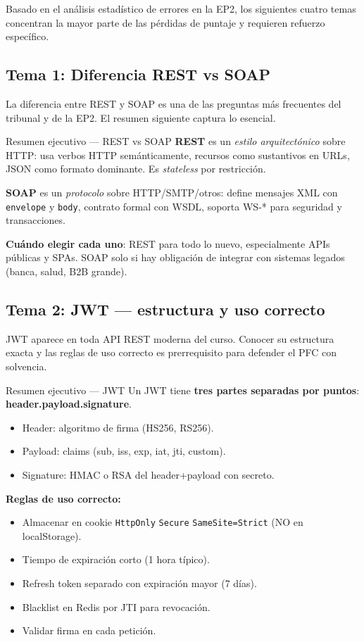 Basado en el análisis estadístico de errores en la EP2, los siguientes
cuatro temas concentran la mayor parte de las pérdidas de puntaje y
requieren refuerzo específico.

\subsection{Tema 1: Diferencia REST vs SOAP}

La diferencia entre REST y SOAP es una de las preguntas más
frecuentes del tribunal y de la EP2. El resumen siguiente captura lo
esencial.


\begin{cajadefinicion}{Resumen ejecutivo --- REST vs SOAP}
\textbf{REST} es un \emph{estilo arquitectónico} sobre HTTP: usa
verbos HTTP semánticamente, recursos como sustantivos en URLs, JSON
como formato dominante. Es \emph{stateless} por restricción.

\textbf{SOAP} es un \emph{protocolo} sobre HTTP/SMTP/otros: define
mensajes XML con \texttt{envelope} y \texttt{body}, contrato formal
con WSDL, soporta WS-* para seguridad y transacciones.

\textbf{Cuándo elegir cada uno}: REST para todo lo nuevo, especialmente
APIs públicas y SPAs. SOAP solo si hay obligación de integrar con
sistemas legados (banca, salud, B2B grande).
\end{cajadefinicion}

\subsection{Tema 2: JWT --- estructura y uso correcto}

JWT aparece en toda API REST moderna del curso. Conocer su
estructura exacta y las reglas de uso correcto es prerrequisito para
defender el PFC con solvencia.


\begin{cajadefinicion}{Resumen ejecutivo --- JWT}
Un JWT tiene \textbf{tres partes separadas por puntos}:
\textbf{header.payload.signature}.

\begin{itemize}
\item Header: algoritmo de firma (HS256, RS256).
\item Payload: claims (sub, iss, exp, iat, jti, custom).
\item Signature: HMAC o RSA del header+payload con secreto.
\end{itemize}

\textbf{Reglas de uso correcto:}
\begin{itemize}
\item Almacenar en cookie \texttt{HttpOnly} \texttt{Secure}
\texttt{SameSite=Strict} (NO en localStorage).
\item Tiempo de expiración corto (1 hora típico).
\item Refresh token separado con expiración mayor (7 días).
\item Blacklist en Redis por JTI para revocación.
\item Validar firma en cada petición.
\end{itemize}
\end{cajadefinicion}

